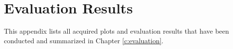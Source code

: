 \chapter{Evaluation Results}
This appendix lists all acquired plots and evaluation results that have been conducted and summarized in Chapter \ref{c:evaluation}.

